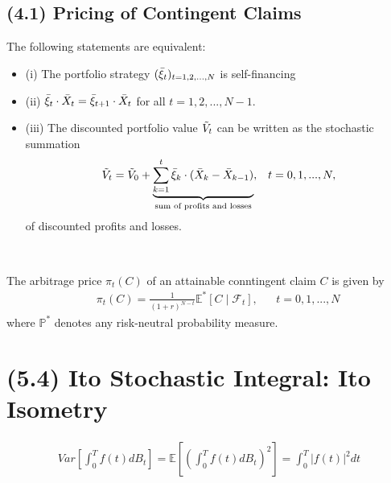 \documentclass[12pt]{extarticle}
\newcommand{\<}{\langle}
\renewcommand{\>}{\rangle}
\theoremstyle{definition}
\begin{document}
\subsection{(4.1) Pricing of Contingent Claims}
\begin{tcolorbox}[enhanced, drop fuzzy shadow, title=Lemma 4.2]
The following statements are equivalent:
\begin{itemize}
    \item (i) The portfolio strategy $(\Bar{\xi}_t)_{t=1,2,...,N}$ is self-financing \\
    \item (ii) $\Bar{\xi}_t \cdot \Bar{X}_t = \Bar{\xi}_{t+1} \cdot \Bar{X}_t$ for all $t=1,2,...,N-1$. \\
    \item (iii) The discounted portfolio value $\Tilde{V}_t$ can be written as the stochastic summation
    \begin{align*}
        \Tilde{V}_t = \Tilde{V}_0 + \underbrace{\sum^t_{k=1}\Bar{\xi}_k \cdot (\Bar{X}_k - \Bar{X}_{k-1})}_\text{sum of profits and losses}, && t=0,1,...,N,
    \end{align*}
    of discounted profits and losses.
\end{itemize}
\end{tcolorbox}
\ \\
\begin{tcolorbox}[enhanced, drop fuzzy shadow, title=Theorem 4.5]
The arbitrage price $\pi_t (C)$ of an attainable conntingent claim $C$ is given by
\begin{align*}
    && \pi_t (C)=\frac{1}{(1+r)^{N-t}}\mathbb{E}^* [C \mid \mathcal{F}_t], && t=0,1,...,N
\end{align*}
where $\mathbb{P}^*$ denotes any risk-neutral probability measure.
\end{tcolorbox}


\newpage
\section{(5.4) Ito Stochastic Integral: Ito Isometry}
\begin{tcolorbox}[enhanced, drop fuzzy shadow, title=Proposition 5.9; Ito Isometry]
\begin{align*}
    Var\left[\int^T_0 f(t)dB_t \right] = \mathbb{E}\left[\left(\int^T_0 f(t)dB_t \right)^2 \right] = \int^T_0 \big|f(t)\big|^2 dt
\end{align*}
\end{tcolorbox}
\end{document}
